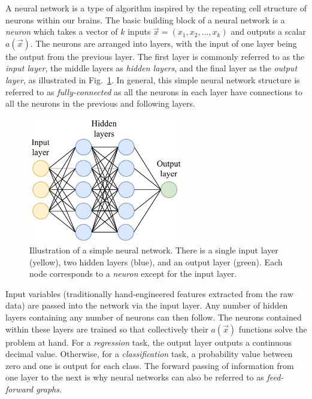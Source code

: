 A neural network is a type of algorithm inspired by the repeating cell structure of neurons within
our brains. The basic building block of a neural network is a \emph{neuron} which takes a vector
of $k$ inputs $\vec{x} = (x_{1}, x_{2},\dots,x_{k})$ and outputs a scalar $a(\vec{x})$. The
neurons are arranged into layers, with the input of one layer being the output from the previous
layer. The first layer is commonly referred to as the \emph{input layer}, the middle layers as
\emph{hidden layers}, and the final layer as the \emph{output layer}, as illustrated in
Fig.~\ref{fig:network}. In general, this simple neural network structure is referred to as
\emph{fully-connected} as all the neurons in each layer have connections to all the neurons in the
previous and following layers.

\begin{figure} %
    \includegraphics[width=0.6\textwidth]{diagrams/6-cvn/network.pdf}
    \caption[Illustration of a simple neural network]
    {Illustration of a simple neural network. There is a single input layer (yellow), two hidden
        layers (blue), and an output layer (green). Each node corresponds to a \emph{neuron}
        except for the input layer.}
    \label{fig:network}
\end{figure}

Input variables (traditionally hand-engineered features extracted from the raw data) are passed
into the network via the input layer. Any number of hidden layers containing any number of neurons
can then follow. The neurons contained within these layers are trained so that collectively their
$a(\vec{x})$ functions solve the problem at hand. For a \emph{regression} task, the output layer
outputs a continuous decimal value. Otherwise, for a \emph{classification} task, a probability
value between zero and one is output for each class. The forward passing of information from one
layer to the next is why neural networks can also be referred to as \emph{feed-forward graphs}.

